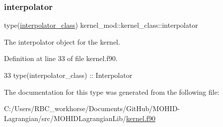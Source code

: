 \subsubsection{\texorpdfstring{interpolator}{interpolator}}
{\footnotesize\ttfamily type(\mbox{\hyperlink{structinterpolator__mod_1_1interpolator__class}{interpolator\+\_\+class}}) kernel\+\_\+mod\+::kernel\+\_\+class\+::interpolator}



The interpolator object for the kernel. 



Definition at line 33 of file kernel.\+f90.


\begin{DoxyCode}
33         \textcolor{keywordtype}{type}(interpolator\_class) :: Interpolator
\end{DoxyCode}


The documentation for this type was generated from the following file\+:\begin{DoxyCompactItemize}
\item 
C\+:/\+Users/\+R\+B\+C\+\_\+workhorse/\+Documents/\+Git\+Hub/\+M\+O\+H\+I\+D-\/\+Lagrangian/src/\+M\+O\+H\+I\+D\+Lagrangian\+Lib/\mbox{\hyperlink{kernel_8f90}{kernel.\+f90}}\end{DoxyCompactItemize}
